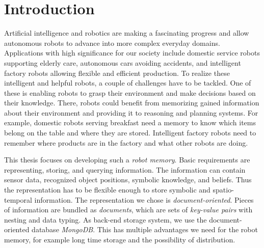 \chapter{Introduction}
\label{chap:introduction}
Artificial intelligence and robotics are making a fascinating progress
and allow autonomous robots to advance into more complex everyday domains.
Applications with high significance for our society include domestic
service robots supporting elderly care, autonomous cars avoiding
accidents, and intelligent factory robots allowing flexible and
efficient production. To realize these intelligent and helpful robots,
a couple of challenges have to be tackled. One of these is enabling
robots to grasp their environment and make decisions based on their
knowledge. There, robots could benefit from memorizing gained information
about their environment and providing it to reasoning and planning
systems. For example, domestic robots serving breakfast need a memory
to know which items belong on the table and where they are
stored. Intelligent factory robots need to remember where products are
in the factory and what other robots are doing.

This thesis focuses on developing such a \emph{robot memory}. Basic
requirements are representing, storing, and querying information. The
information can contain sensor data, recognized object positions,
symbolic knowledge, and beliefs. Thus the representation has to be
flexible enough to store symbolic and spatio-temporal information. The
representation we chose is \emph{document-oriented}. Pieces of
information are bundled as \emph{documents}, which are sets of
\emph{key-value pairs} with nesting and data typing. As
back-end storage system, we use the document-oriented database
\emph{MongoDB}. This has multiple advantages we need for the robot
memory, for example long time storage and the possibility of
distribution.

